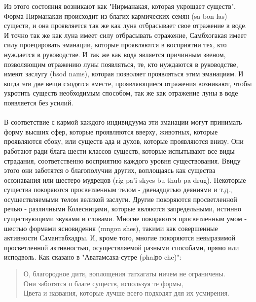Из этого состояния возникают как "Нирманакая, которая укрощает существ". Форма
Нирманакаи происходит из благих кармических семян (sa bon las) существ, и она
проявляется так же как луна отбрасывает свое отражение в воде. И точно так же как луна
имеет силу отбрасывать отражение, Самбхогакая имеет силу проецировать эманации,
которые проявляются в восприятии тех, кто нуждается в руководстве. И так же как вода
является причинным звеном, позволяющим отражению луны появляться, те, кто нуждаются
в руководстве, имеют заслугу (bsod nams), которая позволяет проявляться этим эманациям. И
когда эти две вещи сходятся вместе, проявляющиеся отражения возникают, чтобы укротить
существ необходимым способом, так же как отражение луны в воде появляется без усилий.\\
\\
В соответствие с кармой каждого индивидуума эти эманации могут принимать форму
высших сфер, которые проявляются вверху, животных, которые проявляются сбоку, или
существ ада и духов, которые проявляются внизу. Они работают ради блага шести классов
существ, которые испытывают все виды страдания, соответственно восприятию каждого
уровня существования. Ввиду этого они заботятся о благополучии других, воплощаясь как
существа осознавания или шестеро мудрецов (rig pa'i skyes bu thub pa drug). Некоторые
существа покоряются просветленным телом - двенадцатью деяниями и т.д.,
осуществляемыми телом великой заслуги. Другие покоряются просветленной речью -
различными Колесницами, которые являются запредельными, истинно существующими
звуками и словами. Многие покоряются просветленным умом - шестью формами
ясновидения (mngon shes), такими как совершенные активности Самантабхадры. И, кроме
того, многие покоряются невыразимой просветленной активностью, осуществляемой
разными способами, прямо или исподволь. Как сказано в "Аватамсака-сутре (phalро che)":

\begin{verse}
О, благородное дитя, воплощения татхагаты ничем не ограничены.\\
Они заботятся о благе существ, используя те формы,\\
Цвета и названия, которые лучше всего подходят для их усмирения.
\end{verse}

